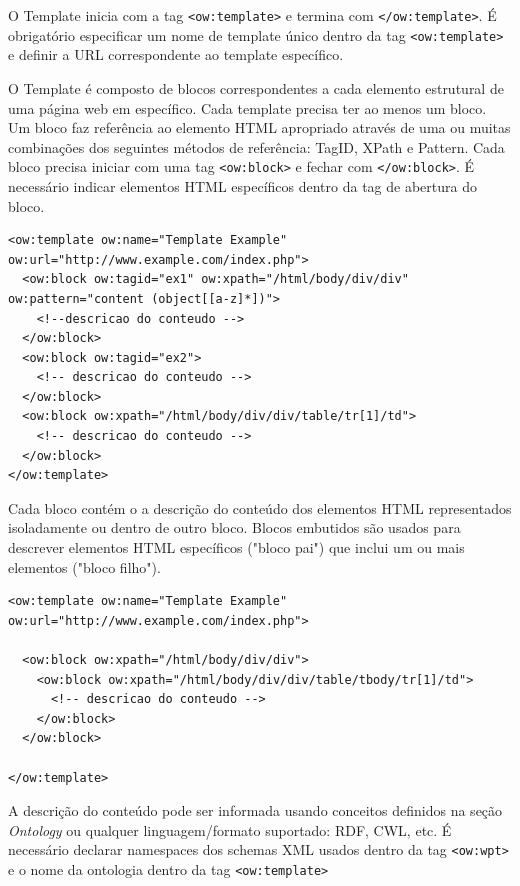 O Template inicia com a tag \texttt{<ow:template>} e termina com  \texttt{</ow:template>}. É obrigatório especificar um nome de template único dentro da tag \texttt{<ow:template>} e definir a URL correspondente ao template específico.

O Template é composto de blocos correspondentes a cada elemento estrutural de uma página web em específico. Cada template precisa ter ao menos um bloco. Um bloco faz referência ao elemento HTML apropriado através de uma ou muitas combinações dos seguintes métodos de referência: TagID, XPath e Pattern. Cada bloco precisa iniciar com uma tag \texttt{<ow:block>} e fechar com \texttt{</ow:block>}. É necessário indicar elementos HTML específicos dentro da tag de abertura do bloco.

\pagebreak
{}
\begin{lstlisting}
<ow:template ow:name="Template Example" ow:url="http://www.example.com/index.php">
  <ow:block ow:tagid="ex1" ow:xpath="/html/body/div/div" ow:pattern="content (object[[a-z]*])">
    <!--descricao do conteudo -->
  </ow:block>
  <ow:block ow:tagid="ex2">
    <!-- descricao do conteudo -->
  </ow:block>
  <ow:block ow:xpath="/html/body/div/div/table/tr[1]/td">
    <!-- descricao do conteudo -->
  </ow:block>
</ow:template>
\end{lstlisting}

Cada bloco contém o a descrição do conteúdo dos elementos HTML representados isoladamente ou dentro de outro bloco. Blocos embutidos são usados para descrever elementos HTML específicos ("bloco pai") que inclui um ou mais elementos ("bloco filho").

\begin{lstlisting}
<ow:template ow:name="Template Example" ow:url="http://www.example.com/index.php">

  <ow:block ow:xpath="/html/body/div/div">
    <ow:block ow:xpath="/html/body/div/div/table/tbody/tr[1]/td">
      <!-- descricao do conteudo -->
    </ow:block>
  </ow:block>
  
</ow:template>
\end{lstlisting}

A descrição do conteúdo pode ser informada usando conceitos definidos na seção \emph{Ontology} ou qualquer linguagem/formato suportado: RDF, CWL, etc. É necessário declarar namespaces dos schemas XML usados dentro da tag \texttt{<ow:wpt>} e o nome da ontologia dentro da tag \texttt{<ow:template>}

